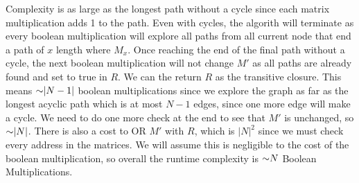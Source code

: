 \begin{problem}
\begin{questions}
Complexity is as large as the longest path without a cycle since each matrix multiplication adds 1 to the path. Even with cycles, the algorith will terminate as every boolean multiplication will explore all paths from all current node that end a path of $x$ length where $M_x$. Once reaching the end of the final path without a cycle, the next boolean multiplication will not change $M'$ as all paths are already found and set to true in $R$. We can the return $R$ as the transitive closure. 
This means $\mathord{\sim}|N-1|$ boolean multiplications since we explore the graph as far as the longest acyclic path which is at most $N-1$ edges, since one more edge will make a cycle. We need to do one more check at the end to see that $M'$ is unchanged, so $\mathord{\sim}|N|$.
There is also a cost to OR $M'$ with $R$, which is $|N|^2$ since we must check every address in the matrices. We will assume this is negligible to the cost of the boolean multiplication, so overall the runtime complexity is $\mathord{\sim}N$ Boolean Multiplications.

\end{questions}
\end{problem}

